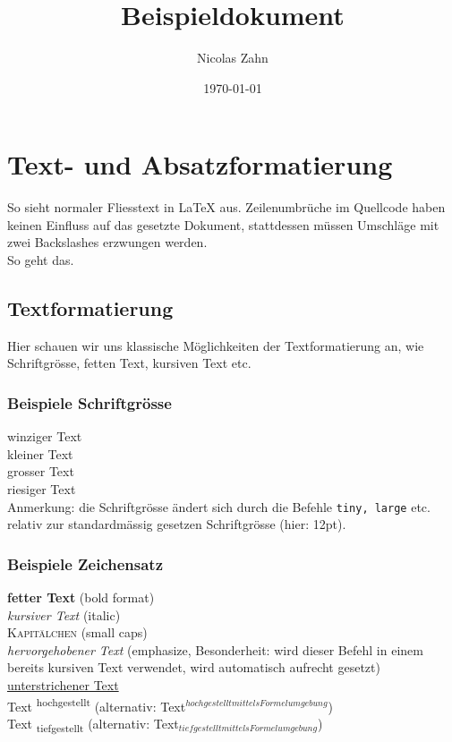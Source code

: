 \documentclass[paper=a4    %
,twoside=false             %
,fontsize=12pt             %
,DIV=11                    %
,parskip=half		   %
]{scrartcl}
\author{Nicolas Zahn}
\title{Beispieldokument}
\date{\today}
\begin{document}
\tableofcontents
\listoffigures
\listoftables
\section{Text- und Absatzformatierung}
So sieht normaler Fliesstext in \LaTeX{}  aus. 
Zeilenumbr\"uche im Quellcode haben keinen Einfluss auf das gesetzte Dokument, stattdessen m\"ussen Umschl\"age mit zwei Backslashes erzwungen werden. \\
So geht das.
\subsection{Textformatierung}
Hier schauen wir uns klassische M\"oglichkeiten der Textformatierung an, wie Schriftgr\"osse, fetten Text, kursiven Text etc.
\subsubsection*{Beispiele Schriftgr\"osse}
\tiny{winziger Text}\\
\small{kleiner Text}\\
\large{grosser Text}\\
\huge{riesiger Text}\\
\normalsize{Anmerkung: die Schriftgr\"osse \"andert sich durch die Befehle \texttt{tiny, large} etc. relativ zur standardm\"assig gesetzen Schriftgr\"osse (hier: 12pt).}
\subsubsection*{Beispiele Zeichensatz}
\textbf{fetter Text} (bold format)\\
\textit{kursiver Text} (italic)\\
\textsc{Kapit\"alchen} (small caps)\\
\emph{hervorgehobener Text} (emphasize, Besonderheit: wird dieser Befehl in einem bereits kursiven Text verwendet, wird automatisch aufrecht gesetzt)\\
\underline{unterstrichener Text}\\
Text \textsuperscript{hochgestellt} (alternativ: Text$^{hochgestellt mittels Formelumgebung}$)\\
Text \textsubscript{tiefgestellt} (alternativ: Text$_{tiefgestellt mittels Formelumgebung}$)
\end{document}
